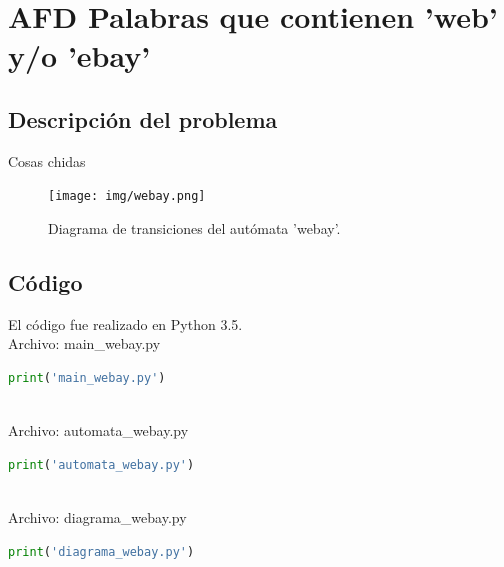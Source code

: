 \section{AFD Palabras que contienen 'web' y/o 'ebay'}
	\subsection{Descripción del problema}
	Cosas chidas
	\begin{figure}[H]
		\begin{center}
		\texttt{[image: img/webay.png]}
		\caption{Diagrama de transiciones del autómata 'webay'.}
		\label{fig:diagrama1}
		\end{center}
	\end{figure}
	\subsection{Código}
	El código fue realizado en Python 3.5.
	\\Archivo: main\_webay.py
	\begin{lstlisting}[language=Python]
	print('main_webay.py')
	\end{lstlisting}
	\\Archivo: automata\_webay.py
	\begin{lstlisting}[language=Python]
	print('automata_webay.py')
	\end{lstlisting}
	\\Archivo: diagrama\_webay.py
	\begin{lstlisting}[language=Python]
	print('diagrama_webay.py')
	\end{lstlisting}
